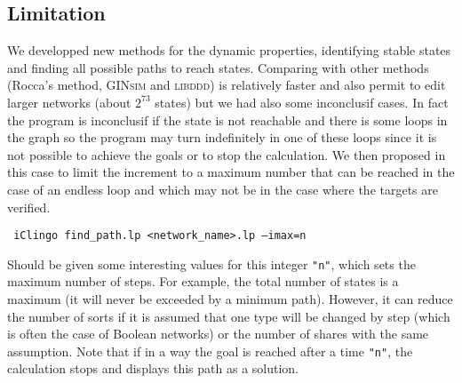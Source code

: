 \subsection{Limitation}

We developped new methods for the dynamic properties, 
identifying stable states and finding all possible paths to reach states. Comparing with other methods (Rocca's method, \textsc{GINsim} and \textsc{libddd}) is relatively faster and also permit to edit larger networks (about $2^{73}$ states) but we had also some inconclusif cases. In fact the program is inconclusif if the state is not reachable and there is some loops in the graph so the program may turn indefinitely in one of these loops since it is not possible to achieve the goals or to stop the calculation. We then proposed in this case to limit the increment to a maximum number that can be reached in the case of an endless loop and which may not be in the case where the targets are verified.
\begin{tabbing}
 \texttt{ iClingo find\_path.lp <network\_name>.lp --imax=n}
\end{tabbing}
Should be given some interesting values for this integer \texttt{"n"}, which sets the maximum number of steps. For example, the total number of states is a maximum (it will never be exceeded by a minimum path). However, it can reduce the number of sorts if it is assumed that one type will be changed by step (which is often the case of Boolean networks) or the number of shares with the same assumption.
Note that if in a way the goal is reached after a time \texttt{"n"}, the calculation stops and displays this path as a solution. 